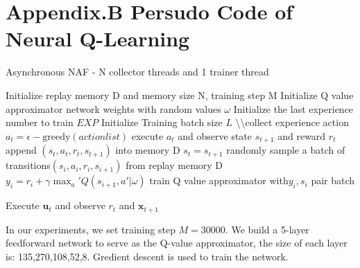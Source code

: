 \documentclass{article}
\begin{document}
 


\section{Appendix.B Persudo Code of Neural Q-Learning}
\begin{algorithm}[H]
	\caption{Asynchronous NAF - N collector threads and 1 trainer thread} 
	\label{alg1}
	\begin{algorithmic}
		\STATE Initialize replay memory D and memory size N, training step M
		\STATE Initialize Q value approximator network weights with random values \(\omega\)
		\STATE Initialize the last experience number to train \(EXP\)
		\STATE Initialize Training batch size \(L\)
			\STATE \textbackslash\textbackslash collect experience
			\STATE action \(a_t = \epsilon-\mathrm{greedy}(actionlist)\)
			\STATE execute \(a_t\) and observe state \(s_{t+1}\) and reward \(r_t\)
			\STATE append \((s_t,a_t,r_t,s_{t+1})\) into memory D
			\STATE \(s_{t} = s_{t+1}\)
		        \STATE  randomly sample a batch of transitions\((s_i,a_i,r_i,s_{i+1})\) from replay memory D
		        \STATE  \(y_i=r_i + \gamma\max_a'Q(s_{i+1},a'|\omega)\)
		        \STATE train Q value approximator with\(y_i,s_i\) pair batch
		    \ENDIF
        
		\ENDFOR

		\STATE Execute \(\boldsymbol{u}_t\) and observe \(r_t\) and \(\boldsymbol{x}_{t+1}\)

		\ENDFOR
	\end{algorithmic}
\end{algorithm}

In our experiments, we set training step \(M = 30000\). We build a 5-layer feedforward network to serve as the Q-value approximator, the size of each layer is: 135,270,108,52,8. Gredient descent is used to train the network. 
\end{document}
